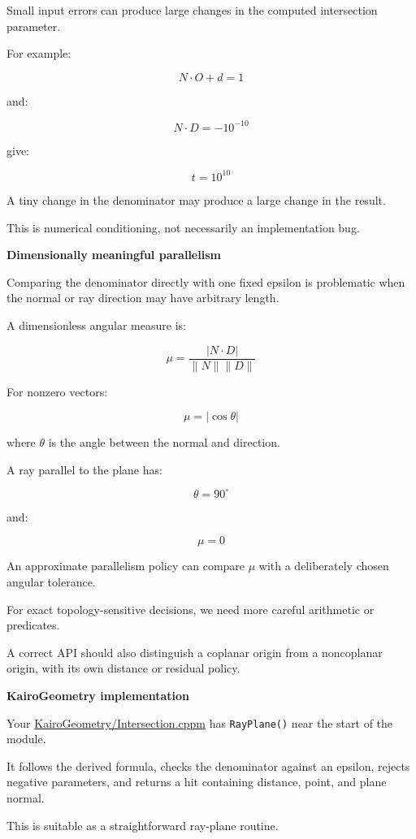Small input errors can produce large changes in the computed intersection parameter.

For example:

\[
N\cdot O+d=1
\]

and:

\[
N\cdot D=-10^{-10}
\]

give:

\[
t=10^{10}
\]

A tiny change in the denominator may produce a large change in the result.

This is numerical conditioning, not necessarily an implementation bug.

\textbf{Dimensionally meaningful parallelism}

Comparing the denominator directly with one fixed epsilon is problematic when the normal or ray direction may have arbitrary length.

A dimensionless angular measure is:

\[
\boxed{ \mu= \frac{|N\cdot D|}{\|N\|\|D\|} }
\]

For nonzero vectors:

\[
\mu=|\cos\theta|
\]

where \(\theta\) is the angle between the normal and direction.

A ray parallel to the plane has:

\[
\theta=90^\circ
\]

and:

\[
\mu=0
\]

An approximate parallelism policy can compare \(\mu\) with a deliberately chosen angular tolerance.

For exact topology-sensitive decisions, we need more careful arithmetic or predicates.

A correct API should also distinguish a coplanar origin from a noncoplanar origin, with its own distance or residual policy.

\textbf{KairoGeometry implementation}

Your \href{https://github.com/swayam8624/KairoGeometry/blob/master/Intersection.cppm?utm_source=chatgpt.com}{KairoGeometry/Intersection.cppm} has \texttt{RayPlane()} near the start of the module.

It follows the derived formula, checks the denominator against an epsilon, rejects negative parameters, and returns a hit containing distance, point, and plane normal.

This is suitable as a straightforward ray-plane routine.

